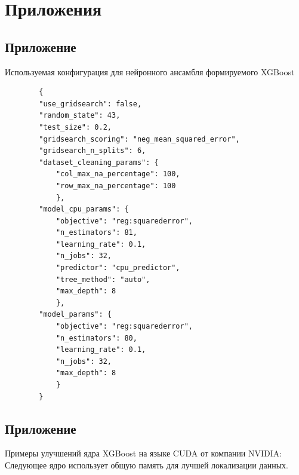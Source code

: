 \documentclass[14pt, a4paper]{extreport}
\begin{document}
    \section{Приложения} \label{sec:attachements}

    \subsection{Приложение } \label{subsec:polaris_learn_config}

    Используемая конфигурация для нейронного ансамбля формируемого XGBoost
    
    \begin{verbatim}
        {
        "use_gridsearch": false,
        "random_state": 43,
        "test_size": 0.2,
        "gridsearch_scoring": "neg_mean_squared_error",
        "gridsearch_n_splits": 6,
        "dataset_cleaning_params": {
            "col_max_na_percentage": 100,
            "row_max_na_percentage": 100
            },
        "model_cpu_params": {
            "objective": "reg:squarederror",
            "n_estimators": 81,
            "learning_rate": 0.1,
            "n_jobs": 32,
            "predictor": "cpu_predictor",
            "tree_method": "auto",
            "max_depth": 8
            },
        "model_params": {
            "objective": "reg:squarederror",
            "n_estimators": 80,
            "learning_rate": 0.1,
            "n_jobs": 32,
            "max_depth": 8
            }
        }
    \end{verbatim}

    \subsection{Приложение } \label{subsec:xgboost_cuda_shared_memory_upgrade}
   Примеры улучшений ядра XGBoost на языке CUDA от компании NVIDIA: Следующее ядро использует общую память для лучшей локализации данных.
\end{document}
